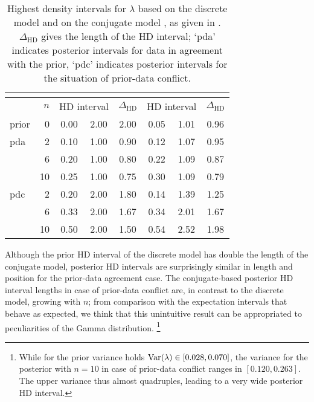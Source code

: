 \begin{table}
\centering
\begin{tabular}{lrcccccc}
\toprule
&     & \multicolumn{3}{c}{\textcite[\S 4.1]{2005:whitcomb}} & \multicolumn{3}{c}{\textcite[\S 4]{2011:krautenbacher}} \\%
\midrule
& $n$ & \multicolumn{2}{c}{HD interval} & $\Delta_\text{HD}$ & \multicolumn{2}{c}{HD interval} & $\Delta_\text{HD}$ \\%
\cmidrule{3-4} \cmidrule{6-7}
prior &  0 & 0.00 & 2.00 & 2.00 & 0.05 & 1.01 & 0.96 \\[0.5ex]
pda   &  2 & 0.10 & 1.00 & 0.90 & 0.12 & 1.07 & 0.95 \\
      &  6 & 0.20 & 1.00 & 0.80 & 0.22 & 1.09 & 0.87 \\
      & 10 & 0.25 & 1.00 & 0.75 & 0.30 & 1.09 & 0.79 \\[0.5ex]
pdc   &  2 & 0.20 & 2.00 & 1.80 & 0.14 & 1.39 & 1.25 \\
      &  6 & 0.33 & 2.00 & 1.67 & 0.34 & 2.01 & 1.67 \\
      & 10 & 0.50 & 2.00 & 1.50 & 0.54 & 2.52 & 1.98 \\
\bottomrule
\end{tabular}
\caption[Highest density intervals for $\lambda$ based on the discrete model
(Whitcomb 2005, \S 4.1) and on the conjugate model (Krautenbacher 2011, \S 4).]%
{Highest density intervals for $\lambda$ based on the discrete model
\parencite[\S 4.1, left]{2005:whitcomb} and on the conjugate model \parencite[\S 4, right]{2011:krautenbacher},
as given in \textcite[Tab.~2, Tab.~3]{2011:krautenbacher}.
$\Delta_\text{HD}$ gives the length of the HD interval;
`pda' indicates posterior intervals for data in agreement with the prior,
`pdc' indicates posterior intervals for the situation of prior-data conflict.}
\label{tab:hdintervals}
\end{table}

Although the prior HD interval of the discrete model has double the length of the conjugate model,
posterior HD intervals are surprisingly similar in length and position
for the prior-data agreement case.
The conjugate-based posterior HD interval lengths in case of prior-data conflict are,
in contrast to the discrete model, growing with $n$;
from comparison with the expectation intervals that behave as expected,
we think that this unintuitive result can be appropriated
to peculiarities of the Gamma distribution.%
\footnote{While for the prior variance holds $\operatorname{Var}(\lambda) \in [0.028, 0.070]$,
the variance for the posterior with $n=10$ in case of prior-data conflict ranges in $[0.120, 0.263]$.
The upper variance thus almost quadruples, leading to a very wide posterior HD interval.}

